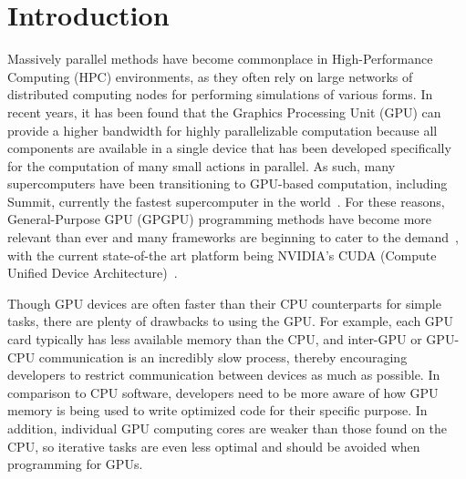 \section*{Introduction}

Massively parallel methods have become commonplace in High-Performance Computing (HPC) environments, as they often rely on large networks of distributed computing nodes for performing simulations of various forms.
In recent years, it has been found that the Graphics Processing Unit (GPU) can provide a higher bandwidth for highly parallelizable computation because all components are available in a single device that has been developed specifically for the computation of many small actions in parallel.
As such, many supercomputers have been transitioning to GPU-based computation, including Summit, currently the fastest supercomputer in the world~\cite{kahle2019}.
For these reasons, General-Purpose GPU (GPGPU) programming methods have become more relevant than ever and many frameworks are beginning to cater to the demand~\cite{reyes2012, fatica2008, besard2016, opencl}, with the current state-of-the art platform being NVIDIA's CUDA (Compute Unified Device Architecture)~\cite{CUDAPG}.

Though GPU devices are often faster than their CPU counterparts for simple tasks, there are plenty of drawbacks to using the GPU.
For example, each GPU card typically has less available memory than the CPU, and inter-GPU or GPU-CPU communication is an incredibly slow process, thereby encouraging developers to restrict communication between devices as much as possible.
In comparison to CPU software, developers need to be more aware of how GPU memory is being used to write optimized code for their specific purpose.
In addition, individual GPU computing cores are weaker than those found on the CPU, so iterative tasks are even less optimal and should be avoided when programming for GPUs.

